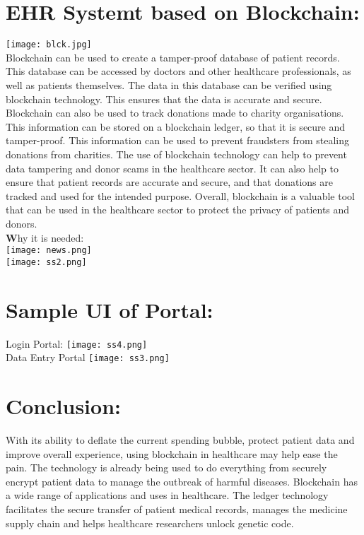 \documentclass[12pt]{article}
\begin{document}
\section*{ \small EHR Systemt based on Blockchain: }
\texttt{[image: blck.jpg]}\\
Blockchain can be used to create a tamper-proof database of patient records. This database can be accessed by doctors and other healthcare professionals, as well as patients themselves. The data in this database can be verified using blockchain technology. This ensures that the data is accurate and secure.
Blockchain can also be used to track donations made to charity organisations. This information can be stored on a blockchain ledger, so that it is secure and tamper-proof. This information can be used to prevent fraudsters from stealing donations from charities.
The use of blockchain technology can help to prevent data tampering and donor scams in the healthcare sector. It can also help to ensure that patient records are accurate and secure, and that donations are tracked and used for the intended purpose. Overall, blockchain is a valuable tool that can be used in the healthcare sector to protect the privacy of patients and donors.\\
\Large \textbf Why it is needed: \\

 \texttt{[image: news.png]}\\
 \texttt{[image: ss2.png]}
 \section*{ \Large Sample UI of Portal: }


\normalsize Login Portal:
\texttt{[image: ss4.png]}\\
\newpage
Data Entry Portal
\texttt{[image: ss3.png]}\\
\Large
\section*{\Huge Conclusion: }
With its ability to deflate the current spending bubble, protect patient data and improve overall experience, using blockchain in healthcare may help ease the pain. The technology is already being used to do everything from securely encrypt patient data to manage the outbreak of harmful diseases.
Blockchain has a wide range of applications and uses in healthcare. The ledger technology facilitates the secure transfer of patient medical records, manages the medicine supply chain and helps healthcare researchers unlock genetic code.\\
\end{document}
